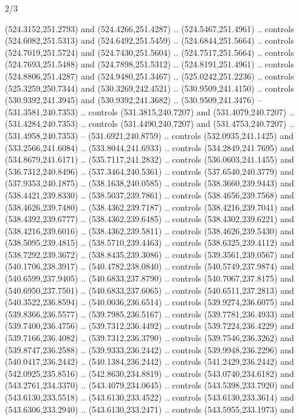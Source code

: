 \begin{flagdescription}{2/3}
\begin{scope}[xshift=0.5\flaglength,yshift=0.5\flagwidth,scale=\flagwidth/495.65]
\begin{scope}[y=0.8pt, x=0.8pt, yscale=-1,shift={(-463.76,-309.78)}]
  (524.3152,251.2793) and (524.4266,251.4287) .. (524.5467,251.4961) .. controls
  (524.6082,251.5313) and (524.6492,251.5459) .. (524.6844,251.5664) .. controls
  (524.7019,251.5724) and (524.7430,251.5604) .. (524.7517,251.5664) .. controls
  (524.7693,251.5488) and (524.7898,251.5312) .. (524.8191,251.4961) .. controls
  (524.8806,251.4287) and (524.9480,251.3467) .. (525.0242,251.2236) .. controls
  (525.3259,250.7344) and (530.3269,242.4521) .. (530.9509,241.4150) .. controls
  (530.9392,241.3945) and (530.9392,241.3682) .. (530.9509,241.3476) --
  (531.3581,240.7353) .. controls (531.3815,240.7207) and (531.4079,240.7207) ..
  (531.4284,240.7353) .. controls (531.4490,240.7207) and (531.4753,240.7207) ..
  (531.4958,240.7353) -- (531.6921,240.8759) .. controls (532.0935,241.1425) and
  (533.2566,241.6084) .. (533.8044,241.6933) .. controls (534.2849,241.7695) and
  (534.8679,241.6171) .. (535.7117,241.2832) .. controls (536.0603,241.1455) and
  (536.7312,240.8496) .. (537.3464,240.5361) .. controls (537.6540,240.3779) and
  (537.9353,240.1875) .. (538.1638,240.0585) .. controls (538.3660,239.9443) and
  (538.4421,239.8330) .. (538.5037,239.7861) .. controls (538.4656,239.7568) and
  (538.4626,239.7480) .. (538.4362,239.7187) .. controls (538.4216,239.7041) and
  (538.4392,239.6777) .. (538.4362,239.6485) .. controls (538.4302,239.6221) and
  (538.4216,239.6016) .. (538.4362,239.5811) .. controls (538.4626,239.5430) and
  (538.5095,239.4815) .. (538.5710,239.4463) .. controls (538.6325,239.4112) and
  (538.7292,239.3672) .. (538.8435,239.3086) .. controls (539.3561,239.0567) and
  (540.1706,238.3917) .. (540.4782,238.0840) .. controls (540.5749,237.9874) and
  (540.6599,237.9405) .. (540.6833,237.8790) .. controls (540.7067,237.8175) and
  (540.6950,237.7501) .. (540.6833,237.6065) .. controls (540.6511,237.2813) and
  (540.3522,236.8594) .. (540.0036,236.6514) .. controls (539.9274,236.6075) and
  (539.8366,236.5577) .. (539.7985,236.5167) .. controls (539.7781,236.4933) and
  (539.7400,236.4756) .. (539.7312,236.4492) .. controls (539.7224,236.4229) and
  (539.7166,236.4082) .. (539.7312,236.3790) .. controls (539.7546,236.3262) and
  (539.8747,236.2588) .. (539.9333,236.2442) .. controls (539.9948,236.2296) and
  (540.0417,236.2442) .. (540.1384,236.2442) .. controls (541.2429,236.2442) and
  (542.0925,235.8516) .. (542.8630,234.8819) .. controls (543.0740,234.6182) and
  (543.2761,234.3370) .. (543.4079,234.0645) .. controls (543.5398,233.7920) and
  (543.6130,233.5518) .. (543.6130,233.4522) .. controls (543.6130,233.3614) and
  (543.6306,233.2940) .. (543.6130,233.2471) .. controls (543.5955,233.1973) and

\end{scope}
\end{scope}
\end{flagdescription}
